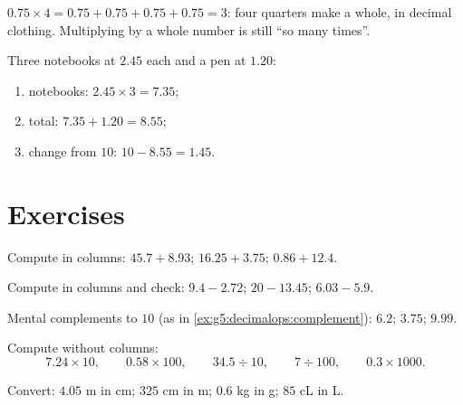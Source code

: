 \begin{example}\label{ex:g5:decimalops:mult}
$0.75 \times 4 = 0.75 + 0.75 + 0.75 + 0.75 = 3$: four quarters make
a whole, in decimal clothing. Multiplying by a whole number is still
``so many times''.
\end{example}

\begin{example}[Shopping]\label{ex:g5:decimalops:shopping}
Three notebooks at $2.45$ each and a pen at $1.20$:
\begin{enumerate}
  \item notebooks: $2.45 \times 3 = 7.35$;
  \item total: $7.35 + 1.20 = 8.55$;
  \item change from $10$: $10 - 8.55 = 1.45$.
\end{enumerate}
\end{example}

\section{Exercises}

\begin{exercise}[$\star$]\label{exo:g5:decimalops:1}
Compute in columns: $45.7 + 8.93$; \quad $16.25 + 3.75$; \quad
$0.86 + 12.4$.
\end{exercise}

\begin{exercise}[$\star$]\label{exo:g5:decimalops:2}
Compute in columns and check: $9.4 - 2.72$; \quad $20 - 13.45$;
\quad $6.03 - 5.9$.
\end{exercise}

\begin{exercise}[$\star$]\label{exo:g5:decimalops:3}
Mental complements to $10$ (as in
\cref{ex:g5:decimalops:complement}): $6.2$; \quad $3.75$; \quad
$9.99$.
\end{exercise}

\begin{exercise}[$\star$]\label{exo:g5:decimalops:4}
Compute without columns:
\[
7.24 \times 10, \qquad
0.58 \times 100, \qquad
34.5 \div 10, \qquad
7 \div 100, \qquad
0.3 \times 1000 .
\]
\end{exercise}

\begin{exercise}[$\star$]\label{exo:g5:decimalops:5}
Convert: $4.05$ m in cm; \quad $325$ cm in m; \quad $0.6$ kg in g;
\quad $85$ cL in L.
\end{exercise}

